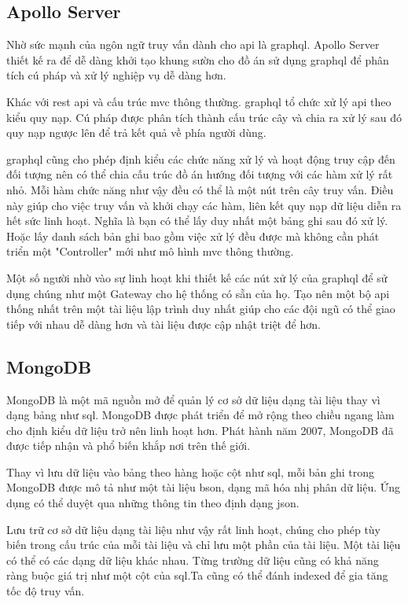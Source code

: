	\subsection{Apollo Server}
	Nhờ sức mạnh của ngôn ngữ truy vấn dành cho \acrshort{api} là \acrshort{graphql}. Apollo Server \cite{apollographql} thiết kế ra để dễ dàng khởi tạo khung sườn cho đồ án sử dụng \acrshort{graphql} để phân tích cú pháp và xử lý nghiệp vụ dễ dàng hơn.
	
	Khác với \acrshort{rest} \acrshort{api} và cấu trúc \acrshort{mvc} thông thường. \acrshort{graphql} tổ chức xử lý \acrshort{api} theo kiểu quy nạp. Cú pháp được phân tích thành cấu trúc cây và chia ra xử lý sau đó quy nạp ngược lên để trả kết quả về phía người dùng.
	
	\acrshort{graphql} cũng cho phép định kiểu các chức năng xử lý và hoạt động truy cập đến đối tượng nên có thể chia cấu trúc đồ án hướng đối tượng với các hàm xử lý rất nhỏ. Mỗi hàm chức năng như vậy đều có thể là một nút trên cây truy vấn. Điều này giúp cho việc truy vấn và khởi chạy các hàm, liên kết quy nạp dữ liệu diễn ra hết sức linh hoạt. Nghĩa là bạn có thể lấy duy nhất một bảng ghi sau đó xử lý. Hoặc lấy danh sách bản ghi bao gồm việc xử lý đều được mà không cần phát triển một "Controller" mới như mô hình \acrshort{mvc} thông thường.
	
	Một số người nhờ vào sự linh hoạt khi thiết kế các nút xử lý của \acrshort{graphql} để sử dụng chúng như một Gateway cho hệ thống có sẵn của họ. Tạo nên một bộ \acrshort{api} thống nhất trên một tài liệu lập trình duy nhất giúp cho các đội ngũ có thể giao tiếp với nhau dễ dàng hơn và tài liệu được cập nhật triệt để hơn.
	
	\subsection{MongoDB}
	MongoDB \cite{mongodb} là một mã nguồn mở để quản lý cơ sở dữ liệu dạng tài liệu thay vì dạng bảng như \acrshort{sql}. MongoDB được phát triển để mở rộng theo chiều ngang làm cho định kiểu dữ liệu trở nên linh hoạt hơn. Phát hành năm 2007, MongoDB đã được tiếp nhận và phổ biến khắp nơi trên thế giới.
	
	Thay vì lưu dữ liệu vào bảng theo hàng hoặc cột như \acrshort{sql}, mỗi bản ghi trong MongoDB được mô tả như một tài liệu  \acrshort{bson}, dạng mã hóa nhị phân dữ liệu. Ứng dụng có thể duyệt qua những thông tin theo định dạng \acrshort{json}.
	
	Lưu trữ cơ sở dữ liệu dạng tài liệu như vậy rất linh hoạt, chúng cho phép tùy biến trong cấu trúc của mỗi tài liệu và chỉ lưu một phần của tài liệu. Một tài liệu có thể có các dạng dữ liệu khác nhau. Từng trường dữ liệu cũng có khả năng ràng buộc giá trị như một cột của \acrshort{sql}.Ta cũng có thể đánh \gls{indexed} để gia tăng tốc độ truy vấn.
	
